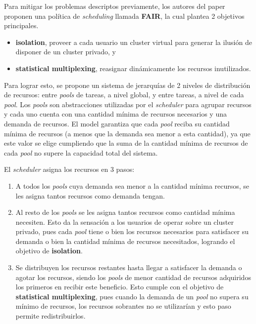 \documentclass[a4paper]{article}
\begin{document}
Para mitigar los problemas descriptos previamente, los autores del paper
proponen una política de \textit{scheduling} llamada \textbf{FAIR}, la cual
plantea 2 objetivos principales.
\begin{itemize}
  \item \textbf{isolation}, proveer a cada usuario un cluster virtual para
  generar la ilusión de disponer de un cluster privado, y
	\item \textbf{statistical multiplexing}, reasignar dinámicamente los recursos
  inutilizados.
\end{itemize}

Para lograr esto, se propone un sistema de jerarquías de 2 niveles de
distribución de recursos: entre \textit{pools} de tareas, a nivel global, y
entre tareas, a nivel de cada \textit{pool}. Los \textit{pools} son
abstracciones utilizadas por el \textit{scheduler} para agrupar recursos y cada
uno cuenta con una cantidad mínima de recursos necesarios y una demanda de
recursos. El model garantiza que cada \textit{pool} reciba su cantidad mínima
de recursos (a menos que la demanda sea menor a esta cantidad), ya que este
valor se elige cumpliendo que la suma de la cantidad mínima de recursos de cada
\textit{pool} no supere la capacidad total del sistema.

El \textit{scheduler} asigna los recursos en 3 pasos:
\begin{enumerate}
	\item A todos los \textit{pools} cuya demanda sea menor a la cantidad mínima
  recursos, se les asigna tantos recursos como demanda tengan.
	\item Al resto de los \textit{pools} se les asigna tantos recursos como
  cantidad mínima necesiten. Esto da la sensación a los usuarios de operar
  sobre un cluster privado, pues cada \textit{pool} tiene o bien los recursos
  necesarios para satisfacer su demanda o bien la cantidad mínima de recursos
  necesitados, logrando el objetivo de \textbf{isolation}.
	\item Se distribuyen los recursos restantes hasta llegar a satisfacer la
  demanda o agotar los recursos, siendo los \textit{pools} de menor cantidad de
  recursos adquiridos los primeros en recibir este beneficio. Esto cumple con
  el objetivo de \textbf{statistical multiplexing}, pues cuando la demanda de
  un \textit{pool} no supera su mínimo de recursos, los recursos sobrantes no
  se utilizarían y esto paso permite redistribuirlos.
\end{enumerate}
\end{document}
